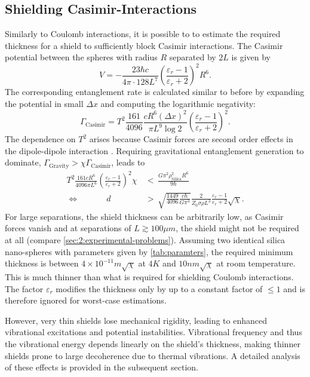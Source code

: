 \subsection{Shielding Casimir-Interactions}
Similarly to Coulomb interactions, it is possible to to estimate the required thickness for a shield to sufficiently block Casimir interactions.
The Casimir potential between the spheres with radius $R$ separated by $2L$ is given by \cite{Emig_2007}
\begin{equation}
  V = -\frac{23 \hbar c}{4\pi \cdot 128 L^7} \left( \frac{\varepsilon_r - 1}{\varepsilon_r + 2} \right)^2 R^6 .
\end{equation}
The corresponding entanglement rate is calculated similar to before by expanding the potential in small $\Delta x$ and computing the logarithmic negativity:
\begin{equation}
  \Gamma_\mathrm{Casimir} = T^2 \frac{161}{4096} \frac{c R^6 (\Delta x)^2}{\pi L^9 \log 2}\left( \frac{\varepsilon_r - 1}{\varepsilon_r + 2}\right)^2 .
\end{equation}
The dependence on $T^2$ arises because Casimir forces are second order effects in the dipole-dipole interaction \cite{Bordag_2001}.
Requiring gravitational entanglement generation to dominate, $\Gamma_\mathrm{Gravity} > \chi \Gamma_\mathrm{Casimir}$, leads to
\begin{align}
  T^2 \frac{161 c R^6}{4096 \pi L^6} \left( \frac{\varepsilon_r - 1}{\varepsilon_r + 2}\right)^2 \chi \, &< \, \frac{G \pi^2 \rho_\mathrm{Silica}^2 R^6}{9\hbar} \\
  \Longleftrightarrow \quad\quad\quad\  d \, &> \, \sqrt{\frac{1449}{4096} \frac{c \hbar}{G \pi^3}} \frac{2}{Z_0 \sigma \rho L^3} \frac{\varepsilon_r - 1}{\varepsilon_r + 2} \sqrt{\chi} .
\end{align}
For large separations, the shield thickness can be arbitrarily low, as Casimir forces vanish and at separations of $L\gtrsim 100\si{\mu m}$, the shield might not be required at all (compare \cref{sec:2:experimental-problems}).
Assuming two identical silica nano-spheres with parameters given by \cref{tab:paramters}, the required minimum thickness is between $4\times 10^{-11}\si{m} \sqrt{\chi}$ at $4\si{K}$ and $10 \si{nm} \sqrt{\chi}$ at room temperature.
This is much thinner than what is required for shielding Coulomb interactions.
The factor $\varepsilon_r$ modifies the thickness only by up to a constant factor of $\leq 1$ and is therefore ignored for worst-case estimations.

However, very thin shields lose mechanical rigidity, leading to enhanced vibrational excitations and potential instabilities.
Vibrational frequency and thus the vibrational energy depends linearly on the shield's thickness, making thinner shields prone to large decoherence due to thermal vibrations.
A detailed analysis of these effects is provided in the subsequent section.




